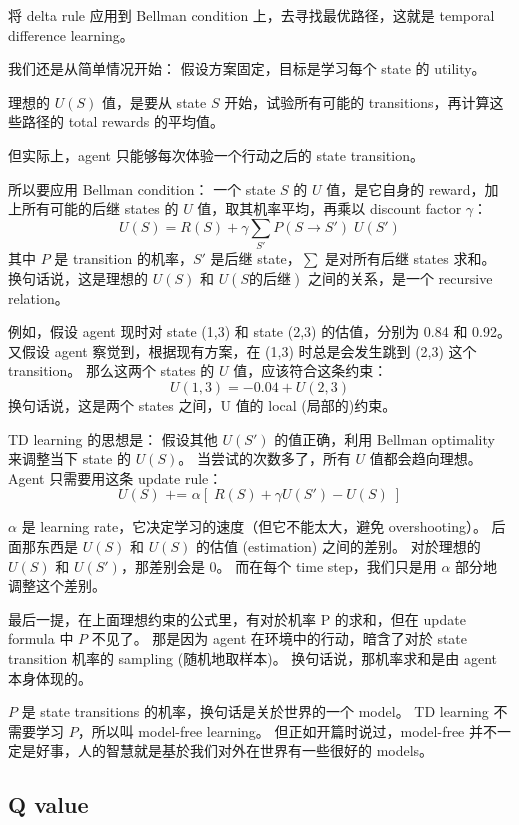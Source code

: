 将 delta rule 应用到 Bellman condition 上，去寻找最优路径，这就是 temporal difference learning。

我们还是从简单情况开始：  假设方案固定，目标是学习每个 state 的 utility。

理想的 $U(S)$ 值，是要从 state $S$ 开始，试验所有可能的 transitions，再计算这些路径的 total rewards 的平均值。

但实际上，agent 只能够每次体验一个行动之后的 state transition。

所以要应用 Bellman condition： 一个 state $S$ 的 $U$ 值，是它自身的 reward，加上所有可能的后继 states 的 $U$ 值，取其机率平均，再乘以 discount factor $\gamma$：
$$ U(S) = R(S) + \gamma \sum_{S'} P(S \rightarrow S') \; U(S') $$
其中 $P$ 是 transition 的机率，$S'$ 是后继 state，$\sum$ 是对所有后继 states 求和。  换句话说，这是理想的 $U(S)$ 和 $U(S \mbox{的后继})$ 之间的关系，是一个 recursive relation。

例如，假设 agent 现时对 state (1,3) 和 state (2,3) 的估值，分别为 0.84 和 0.92。  又假设 agent 察觉到，根据现有方案，在 (1,3) 时总是会发生跳到 (2,3) 这个 transition。  那么这两个 states 的 $U$ 值，应该符合这条约束：
$$ U(1,3) = -0.04 + U(2,3) $$
换句话说，这是两个 states 之间，U 值的 local (局部的)约束。

TD learning 的思想是：  假设其他 $U(S')$ 的值正确，利用 Bellman optimality 来调整当下 state 的 $U(S)$。 当尝试的次数多了，所有 $U$ 值都会趋向理想。 Agent 只需要用这条 update rule：
$$ U(S) \mbox{  +=  } \alpha [ \; R(S) + \gamma U(S') - U(S) \; ] $$

$\alpha$ 是 learning rate，它决定学习的速度（但它不能太大，避免 overshooting）。  后面那东西是 $U(S)$ 和 $U(S)$ 的估值 (estimation) 之间的差别。  对於理想的 $U(S)$ 和 $U(S')$，那差别会是 0。  而在每个 time step，我们只是用 $\alpha$ 部分地 调整这个差别。

最后一提，在上面理想约束的公式里，有对於机率 P 的求和，但在 update formula 中 $P$ 不见了。  那是因为 agent 在环境中的行动，暗含了对於 state transition 机率的 sampling (随机地取样本)。 换句话说，那机率求和是由 agent 本身体现的。

$P$ 是 state transitions 的机率，换句话是关於世界的一个 model。 TD learning 不需要学习 $P$，所以叫 model-free learning。  但正如开篇时说过，model-free 并不一定是好事，人的智慧就是基於我们对外在世界有一些很好的 models。

\subsection{Q value}

